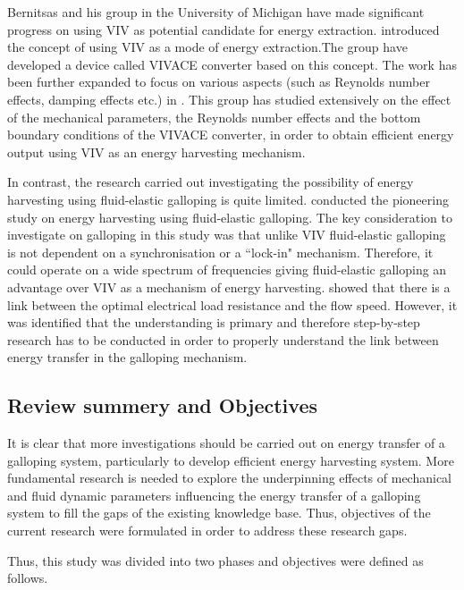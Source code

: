 Bernitsas and his group in the University of Michigan have made significant progress on using VIV as potential candidate for energy extraction. \cite{Bernitsas2008a-concept} introduced the concept of using VIV as a mode of energy extraction.The group have developed a device called VIVACE converter based on this concept. The work has been further expanded to focus on various aspects (such as Reynolds number effects, damping effects etc.) in \citet{Bernitsas2009,Raghavan2009,Raghavan2010a,Lee2011a}. This group has studied extensively on the effect of the mechanical parameters, the Reynolds number effects and the bottom boundary conditions of the VIVACE converter, in order to obtain efficient energy output using VIV as an energy harvesting mechanism. 

In contrast, the research carried out investigating the possibility of energy harvesting using fluid-elastic galloping is quite limited. \citet{Barrero-Gil2010a} conducted the pioneering study on energy harvesting using fluid-elastic galloping. The key consideration to investigate on galloping in this study was that unlike VIV fluid-elastic galloping is not dependent on a synchronisation or a ``lock-in" mechanism. Therefore, it could operate on a wide spectrum of frequencies giving fluid-elastic galloping an advantage over VIV as a mechanism of energy harvesting. \citet{vicente-Ludlam2014} showed that there is a link between the optimal electrical load resistance and the flow speed. However, it was identified that the understanding is primary and therefore step-by-step research has to be conducted in order to properly understand the link between energy transfer in the galloping mechanism.

\subsection{Review summery and Objectives}

 It is clear that more investigations should be carried out on energy transfer of a galloping system, particularly to develop efficient energy harvesting system. More fundamental research is needed to explore the underpinning effects of mechanical and fluid dynamic parameters influencing the energy transfer of a galloping system to fill the gaps of the existing knowledge base. Thus, objectives of the current research were formulated in order to address these research gaps.
 
 Thus, this study was divided into two phases and objectives were defined as follows.
 
